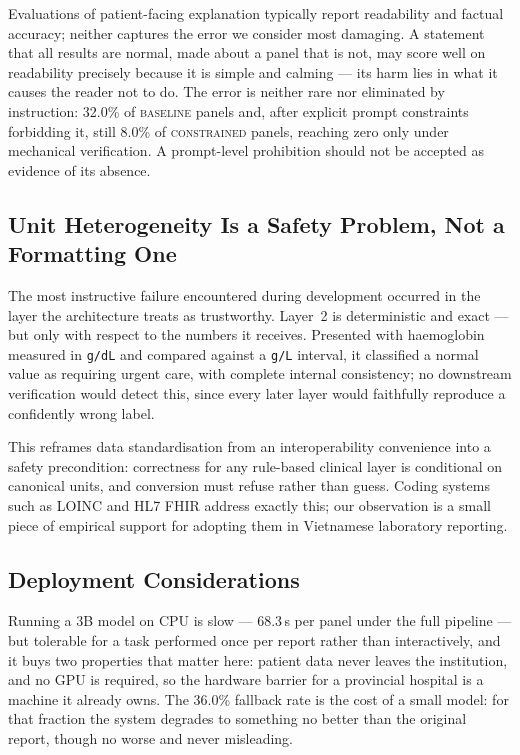 \documentclass{svproc}
\begin{document}
Evaluations of patient-facing explanation typically report readability
and factual accuracy; neither captures the error we consider most
damaging. A statement that all results are normal, made about a panel
that is not, may score well on readability precisely because it is
simple and calming --- its harm lies in what it causes the reader not to
do. The error is neither rare nor eliminated by instruction: 32.0\% of
\textsc{baseline} panels and, after explicit prompt constraints
forbidding it, still 8.0\% of \textsc{constrained} panels, reaching zero
only under mechanical verification. A prompt-level prohibition should not
be accepted as evidence of its absence.

\subsection{Unit Heterogeneity Is a Safety Problem, Not a Formatting One}

The most instructive failure encountered during development occurred in
the layer the architecture treats as trustworthy. Layer~2 is deterministic
and exact --- but only with respect to the numbers it receives. Presented
with haemoglobin measured in \texttt{g/dL} and compared against a
\texttt{g/L} interval, it classified a normal value as requiring urgent
care, with complete internal consistency; no downstream verification
would detect this, since every later layer would faithfully reproduce a
confidently wrong label.

This reframes data standardisation from an interoperability convenience
into a safety precondition: correctness for any rule-based clinical layer
is conditional on canonical units, and conversion must refuse rather than
guess. Coding systems such as LOINC and HL7 FHIR address exactly this;
our observation is a small piece of empirical support for adopting them
in Vietnamese laboratory reporting.

\subsection{Deployment Considerations}

Running a 3B model on CPU is slow --- 68.3\,s per panel under the full
pipeline --- but tolerable for a task performed once per report rather
than interactively, and it buys two properties that matter here: patient
data never leaves the institution, and no GPU is required, so the
hardware barrier for a provincial hospital is a machine it already owns.
The 36.0\% fallback rate is the cost of a small model: for that fraction
the system degrades to something no better than the original report,
though no worse and never misleading.
\end{document}

